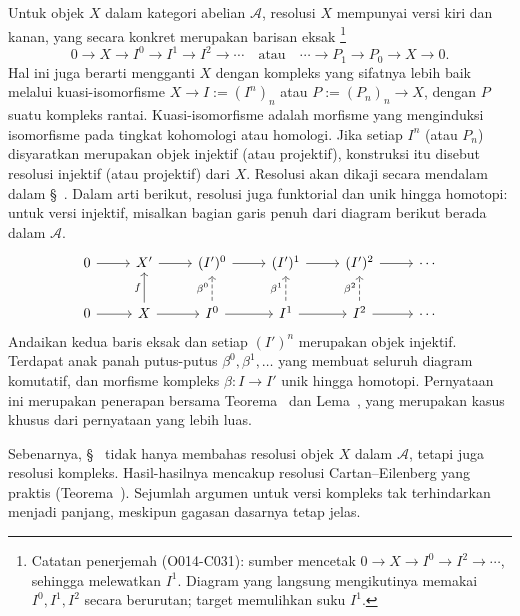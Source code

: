 Untuk objek $X$ dalam kategori abelian $\mathcal{A}$, resolusi $X$ mempunyai
versi kiri dan kanan, yang secara konkret merupakan barisan eksak%
\footnote{Catatan penerjemah (O014-C031): sumber mencetak
$0\to X\to I^0\to I^2\to\cdots$, sehingga melewatkan $I^1$. Diagram yang
langsung mengikutinya memakai $I^0,I^1,I^2$ secara berurutan; target
memulihkan suku $I^1$.}
\[
  0\to X\to I^0\to I^1\to I^2\to\cdots
  \quad\text{atau}\quad
  \cdots\to P_1\to P_0\to X\to0 .
\]
Hal ini juga berarti mengganti $X$ dengan kompleks yang sifatnya lebih baik
melalui kuasi-isomorfisme $X\to I:=(I^n)_n$ atau $P:=(P_n)_n\to X$, dengan
$P$ suatu kompleks rantai. Kuasi-isomorfisme adalah morfisme yang menginduksi
isomorfisme pada tingkat kohomologi atau homologi. Jika setiap $I^n$ (atau
$P_n$) disyaratkan merupakan objek injektif (atau projektif), konstruksi itu
disebut resolusi injektif (atau projektif) dari $X$. Resolusi akan dikaji
secara mendalam dalam \S~. Dalam arti
berikut, resolusi juga funktorial dan unik hingga homotopi: untuk versi
injektif, misalkan bagian
garis penuh dari diagram berikut berada dalam $\mathcal{A}$.
\[
\begin{tikzcd}
	0 \arrow[r] & X' \arrow[r] & (I')^0 \arrow[r] & (I')^1 \arrow[r]
	  & (I')^2 \arrow[r] & \cdots \\
	0 \arrow[r] & X \arrow[u,"f"] \arrow[r]
	  & I^0 \arrow[dashed,u,"{\beta^0}"] \arrow[r]
	  & I^1 \arrow[r] \arrow[dashed,u,"{\beta^1}"]
	  & I^2 \arrow[r] \arrow[dashed,u,"{\beta^2}"] & \cdots
\end{tikzcd}
\]
Andaikan kedua baris eksak dan setiap $(I')^n$ merupakan objek injektif.
Terdapat anak panah putus-putus $\beta^0,\beta^1,\ldots$ yang membuat seluruh
diagram komutatif, dan morfisme kompleks $\beta:I\to I'$ unik hingga
homotopi. Pernyataan ini merupakan penerapan bersama
Teorema~ dan
Lema~, yang merupakan kasus
khusus dari pernyataan yang lebih luas.

Sebenarnya, \S~ tidak hanya membahas
resolusi objek $X$ dalam $\mathcal{A}$, tetapi juga resolusi kompleks.
Hasil-hasilnya mencakup resolusi Cartan--Eilenberg yang praktis
(Teorema~). Sejumlah argumen
 untuk versi kompleks tak terhindarkan menjadi panjang, meskipun gagasan
dasarnya tetap jelas.

